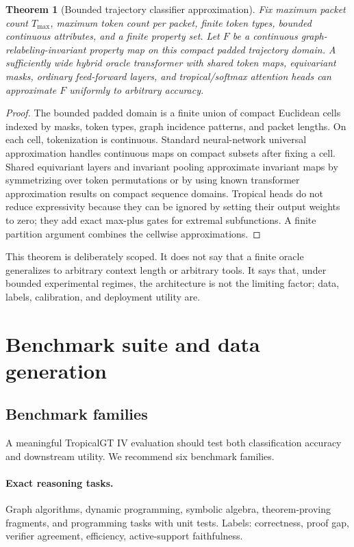 \documentclass[11pt]{article}
\newtheorem{theorem}{Theorem}[section]
\theoremstyle{definition}
\theoremstyle{remark}
\numberwithin{equation}{section}
\begin{document}
\begin{theorem}[Bounded trajectory classifier approximation]
Fix maximum packet count \(T_{\max}\), maximum token count per packet, finite token types, bounded continuous attributes, and a finite property set.  Let \(F\) be a continuous graph-relabeling-invariant property map on this compact padded trajectory domain.  A sufficiently wide hybrid oracle transformer with shared token maps, equivariant masks, ordinary feed-forward layers, and tropical/softmax attention heads can approximate \(F\) uniformly to arbitrary accuracy.
\end{theorem}
\begin{proof}
The bounded padded domain is a finite union of compact Euclidean cells indexed by masks, token types, graph incidence patterns, and packet lengths.  On each cell, tokenization is continuous.  Standard neural-network universal approximation handles continuous maps on compact subsets after fixing a cell.  Shared equivariant layers and invariant pooling approximate invariant maps by symmetrizing over token permutations or by using known transformer approximation results on compact sequence domains.  Tropical heads do not reduce expressivity because they can be ignored by setting their output weights to zero; they add exact max-plus gates for extremal subfunctions.  A finite partition argument combines the cellwise approximations.
\end{proof}

This theorem is deliberately scoped.  It does not say that a finite oracle generalizes to arbitrary context length or arbitrary tools.  It says that, under bounded experimental regimes, the architecture is not the limiting factor; data, labels, calibration, and deployment utility are.

\section{Benchmark suite and data generation}

\subsection{Benchmark families}

A meaningful TropicalGT IV evaluation should test both classification accuracy and downstream utility.  We recommend six benchmark families.

\paragraph{Exact reasoning tasks.}  Graph algorithms, dynamic programming, symbolic algebra, theorem-proving fragments, and programming tasks with unit tests.  Labels: correctness, proof gap, verifier agreement, efficiency, active-support faithfulness.
\end{document}
